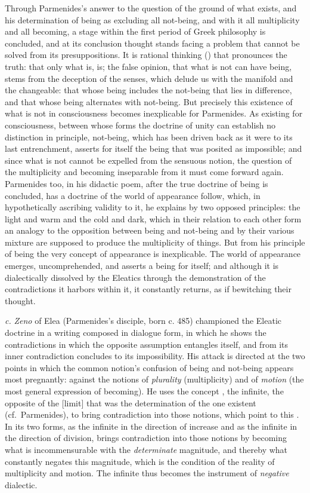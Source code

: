 Through Parmenides's answer to the question of
the ground of what exists, and his determination of being as
excluding all not-being, and with it all multiplicity
and all becoming, a stage within the first period of Greek philosophy is concluded, and at its conclusion
thought stands facing a problem that cannot be solved from its presuppositions.
It is rational thinking () that
pronounces the truth: that only what is, is; the false opinion,
that what is not can have being, stems from the deception of the senses,
which delude us with the manifold and the changeable: that whose being includes the not-being that lies in difference,
and that whose being alternates with not-being. But
precisely this existence of what is not in consciousness becomes
inexplicable for Parmenides. As existing for consciousness,
between whose forms the doctrine of unity can establish no distinction in principle, not-being, which has been driven back
as it were to its last entrenchment, asserts for itself the being that was posited
as impossible; and since what is not cannot be expelled
from the sensuous notion, the question of the multiplicity and becoming inseparable from it must come forward again.
Parmenides too, in his didactic poem, after the true doctrine
of being is concluded, has a doctrine of the world of appearance follow,
which, in hypothetically ascribing validity to it, he explains by two opposed principles: the light and warm and the
cold and dark, which in their relation to each other form an
analogy to the opposition between being and not-being and
by their various mixture are supposed to produce the multiplicity of things. But from his principle of being the very concept
of appearance is inexplicable. The world of appearance emerges, uncomprehended,
and asserts a being for itself; and although it is dialectically dissolved by the Eleatics through the demonstration of the contradictions it
harbors within it, it constantly returns, as if bewitching
their thought.

\textit{c.} \emph{Zeno} of Elea (Parmenides's disciple, born c. 485)
championed the Eleatic doctrine in a
writing composed in dialogue form, in which he shows the contradictions in which the opposite
assumption entangles itself, and from its inner contradiction concludes
to its impossibility. His attack is directed at the two points
in which the common notion's confusion of being
and not-being appears most pregnantly: against the notions
of \emph{plurality} (multiplicity) and of \emph{motion} (the most general
expression of becoming). He uses the concept , the
infinite, the opposite of the  [limit] that was the determination of the one
existent (cf.\ Parmenides), to bring contradiction into those notions, which point to this .
In its two forms, as the infinite in the direction of increase
and as the infinite in the direction of division, 
brings contradiction into those notions by becoming what is incommensurable with the
\emph{determinate} magnitude, and thereby what
constantly negates this magnitude, which is the condition of the
reality of multiplicity and motion. The infinite
thus becomes the instrument of \emph{negative} dialectic.


